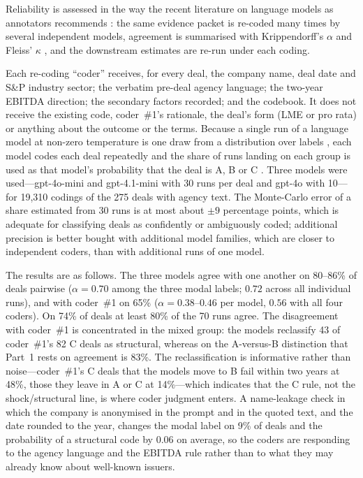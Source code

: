 \documentclass[12pt]{article}
\begin{document}
Reliability is assessed in the way the recent literature on language models as annotators recommends \citep{gilardi2023, tornberg2024, ziems2024}: the same evidence packet is re-coded many times by several independent models, agreement is summarised with Krippendorff's $\alpha$ \citep{krippendorff2018} and Fleiss' $\kappa$ \citep{landis1977}, and the downstream estimates are re-run under each coding.

Each re-coding ``coder'' receives, for every deal, the company name, deal date and S\&P industry sector; the verbatim pre-deal agency language; the two-year EBITDA direction; the secondary factors recorded; and the codebook. It does not receive the existing code, coder~\#1's rationale, the deal's form (LME or pro rata) or anything about the outcome or the terms. Because a single run of a language model at non-zero temperature is one draw from a distribution over labels \citep{reiss2023}, each model codes each deal repeatedly and the share of runs landing on each group is used as that model's probability that the deal is A, B or C \citep[``self-consistency'';][]{wang2023}. Three models were used---gpt-4o-mini and gpt-4.1-mini with 30 runs per deal and gpt-4o with 10---for 19,310 codings of the 275 deals with agency text. The Monte-Carlo error of a share estimated from 30 runs is at most about $\pm 9$ percentage points, which is adequate for classifying deals as confidently or ambiguously coded; additional precision is better bought with additional model families, which are closer to independent coders, than with additional runs of one model.

The results are as follows. The three models agree with one another on 80--86\% of deals pairwise ($\alpha = 0.70$ among the three modal labels; $0.72$ across all individual runs), and with coder~\#1 on 65\% ($\alpha = 0.38$--$0.46$ per model, $0.56$ with all four coders). On 74\% of deals at least 80\% of the 70 runs agree. The disagreement with coder~\#1 is concentrated in the mixed group: the models reclassify 43 of coder~\#1's 82 C deals as structural, whereas on the A-versus-B distinction that Part~1 rests on agreement is 83\%. The reclassification is informative rather than noise---coder~\#1's C deals that the models move to B fail within two years at 48\%, those they leave in A or C at 14\%---which indicates that the C rule, not the shock/structural line, is where coder judgment enters. A name-leakage check in which the company is anonymised in the prompt and in the quoted text, and the date rounded to the year, changes the modal label on 9\% of deals and the probability of a structural code by 0.06 on average, so the coders are responding to the agency language and the EBITDA rule rather than to what they may already know about well-known issuers. 
\end{document}
